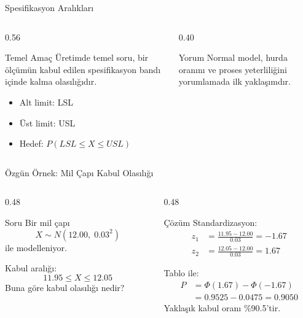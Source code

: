 \documentclass[light]{lutbeamer}
\begin{document}
\begin{frame}{Spesifikasyon Aralıkları}
\small
\begin{columns}[T,onlytextwidth]
    \begin{column}{0.56\textwidth}
        \begin{block}{Temel Amaç}
            Üretimde temel soru, bir ölçümün kabul edilen spesifikasyon bandı içinde kalma olasılığıdır.
        \end{block}

        \begin{itemize}
            \item Alt limit: LSL
            \item Üst limit: USL
            \item Hedef: $P(LSL \le X \le USL)$
        \end{itemize}
    \end{column}
    \begin{column}{0.40\textwidth}
        \begin{exampleblock}{Yorum}
            Normal model, hurda oranını ve proses yeterliliğini yorumlamada ilk yaklaşımdır.
        \end{exampleblock}
    \end{column}
\end{columns}
\end{frame}

\begin{frame}{Özgün Örnek: Mil Çapı Kabul Olasılığı}
\small
\begin{columns}[T,onlytextwidth]
    \begin{column}{0.48\textwidth}
        \begin{block}{Soru}
            Bir mil çapı
            \[
            X \sim N(12.00,\;0.03^2)
            \]
            ile modelleniyor.

            \vspace{0.15cm}
            Kabul aralığı:
            \[
            11.95 \le X \le 12.05
            \]
            Buna göre kabul olasılığı nedir?
        \end{block}
    \end{column}
    \begin{column}{0.48\textwidth}
            \begin{exampleblock}{Çözüm}
            Standardizasyon:
            \[
            \begin{aligned}
            z_1&=\frac{11.95-12.00}{0.03}=-1.67 \\
            z_2&=\frac{12.05-12.00}{0.03}=1.67
            \end{aligned}
            \]

            Tablo ile:
            \[
            \begin{aligned}
            P &= \Phi(1.67)-\Phi(-1.67) \\
              &= 0.9525-0.0475 = 0.9050
            \end{aligned}
            \]
            Yaklaşık kabul oranı \%90.5'tir.
        \end{exampleblock}
    \end{column}
\end{columns}
\end{frame}
\end{document}
